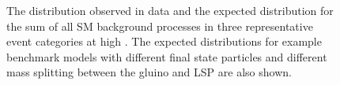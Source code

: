 \begin{figure}[tbhp]
\begin{center}
  \end{center}
  \caption{ The \mht distribution observed in data and the expected
    distribution for the sum of all SM background processes in three 
    representative event categories at high \scalht. The expected
    distributions for example benchmark models with different final state 
    particles and different mass splitting between the gluino and LSP 
    are also shown. \label{fig:mht-templates} }
\end{figure}

